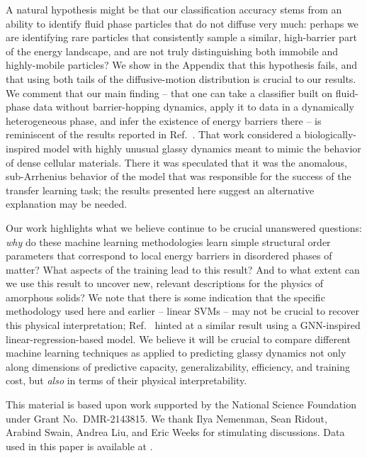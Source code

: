 \documentclass[aps,reprint,superscriptaddress,nofootinbib, notitlepage,prl]{revtex4-2}
\begin{document}
A natural hypothesis might be that our classification accuracy stems from an ability to identify fluid phase particles that do not diffuse very much: perhaps we are identifying rare particles that consistently sample a similar, high-barrier part of the energy landscape, and are not truly distinguishing both immobile and highly-mobile particles? We show in the Appendix that this hypothesis fails, and that using both tails of the diffusive-motion distribution is crucial to our results. We comment that our main finding --  that one can take a classifier built on fluid-phase data without barrier-hopping dynamics, apply it to data in a dynamically heterogeneous phase, and infer the existence of energy barriers there -- is reminiscent of the results reported in Ref.~\cite{tah2021quantifying}. That work considered a biologically-inspired model with highly unusual glassy dynamics \cite{sussman2018anomalous,li2021softness,pinto2022hierarchical} meant to mimic the behavior of dense cellular materials. There it was speculated that it was the anomalous, sub-Arrhenius behavior of the model  that was responsible for the success of the transfer learning task; the results presented here suggest an alternative explanation may be needed. 


Our work highlights what we believe continue to be crucial unanswered questions: \emph{why} do these machine learning methodologies learn simple structural order parameters that correspond to local energy barriers in disordered phases of matter? What aspects of the training lead to this result? And to what extent can we use this result to uncover new, relevant descriptions for the physics of amorphous solids? We note that there is some indication that the specific methodology used here and earlier -- linear SVMs -- may not be crucial to recover this physical interpretation; Ref.~\cite{boattini2021averaging} hinted at a similar result using a GNN-inspired linear-regression-based model. We believe it will be crucial to compare different machine learning techniques as applied to predicting glassy dynamics \cite{alkemade2022comparing,bapst2020unveiling} not only along dimensions of predictive capacity, generalizability, efficiency, and training cost, but \emph{also} in terms of their physical interpretability.


\begin{acknowledgments}

This material is based upon work supported by the National Science Foundation under Grant No.~DMR-2143815. We thank Ilya Nemenman, Sean Ridout, Arabind Swain, Andrea Liu, and Eric Weeks for stimulating discussions. Data used in this paper is available at \cite{obadiyaDataset2022}.
\end{acknowledgments}
\end{document}
